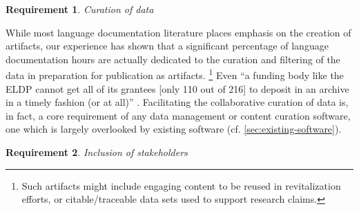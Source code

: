 \documentclass[11pt]{article}
\newcommand{\smalltodo}[2][]
    {\todo[caption={#2}, #1]
    {\tiny#2\normalsize}}
\newtheorem{requirement}{Requirement}
\begin{document}



\begin{requirement}
	\label{req:curation}
       Curation of data
\end{requirement}


While most language documentation literature places emphasis on the creation of
artifacts, our experience has shown that a significant percentage of language
documentation hours are actually dedicated to the curation and filtering of the
data in preparation for publication as artifacts.%
\footnote{Such artifacts might include engaging content to be reused in
    revitalization efforts, or citable/traceable data sets used to support
research claims.}
Even ``a funding body like the ELDP cannot get all of its grantees [only 110
out of 216] to deposit in an archive in a timely fashion (or at all)''
\cite{Thieberger:2012}. Facilitating the collaborative curation of data is, in
fact, a core requirement of any data management or content curation software,
one which is largely overlooked by existing software (cf.
\autoref{sec:existing-software}).%


 
 

\begin{requirement}
	\label{req:inclusive}
       Inclusion of stakeholders
\end{requirement}
\end{document}

